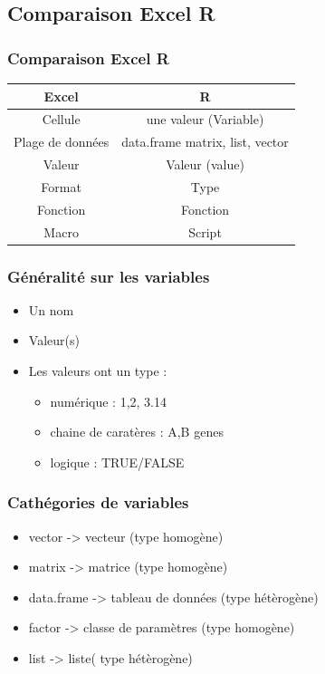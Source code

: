 \documentclass{beamer}
\begin{document}
\subsection{Comparaison Excel R}
\begin{frame}
	\frametitle{Comparaison Excel R}
	\begin{center}
	\begin{tabular}[h]{|c|c|}
		\hline
		Excel & R \\
		\hline
		Cellule & une valeur (Variable) \\
		\hline
		Plage de données & data.frame matrix, list, vector \\
		\hline
		Valeur & Valeur (value) \\
		\hline
		Format & Type \\
		\hline
		Fonction & Fonction \\
		\hline
		Macro & Script \\
		\hline
	\end{tabular}
	\end{center}
\end{frame}

\begin{frame}
	\frametitle{Généralité sur les variables}
	\begin{itemize}
		\item Un nom
		\item Valeur(s)
		\item Les valeurs ont un type : 
			\begin{itemize}
				\item numérique : 1,2, 3.14
				\item chaine de caratères : A,B genes
				\item logique : TRUE/FALSE
			\end{itemize}
	\end{itemize}
\end{frame}

\begin{frame}
	\frametitle{Cathégories de variables}
	\begin{center}
		\begin{itemize}
			\item vector -> vecteur (type homogène)
			\item matrix -> matrice (type homogène)
			\item data.frame -> tableau de données (type hétèrogène)
			\item factor -> classe de paramètres (type homogène)
			\item list -> liste( type hétèrogène)
		\end{itemize}
	\end{center}
\end{frame}
\end{document}
